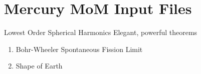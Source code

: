 % 

\section{Mercury MoM Input Files}
\begin{frame}{Lowest Order Spherical Harmonics}
Elegant, powerful theorems
\begin{enumerate}
	\item Bohr-Wheeler Spontaneous Fission Limit
	\item Shape of Earth
\end{enumerate}
\end{frame}

\endinput  %
